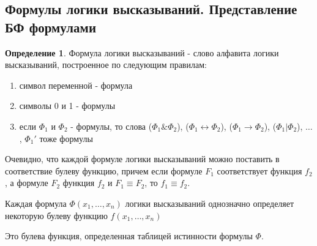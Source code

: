 \documentclass[a4paper]{article}
\theoremstyle{definition}
\newtheorem*{definition}{Определение}
\theoremstyle{remark}
\begin{document}
    \subsection{Формулы логики высказываний. Представление БФ формулами}
    \begin{definition}
        Формула логики высказываний - слово алфавита логики высказываний,
        построенное по следующим правилам:
        \begin{enumerate}
            \item символ переменной - формула
            \item символы 0 и 1 - формулы
            \item если $\Phi_1$ и $\Phi_2$ - формулы, то слова ($\Phi_1 \& \Phi_2$),
            ($\Phi_1 \leftrightarrow \Phi_2$), ($\Phi_1 \rightarrow \Phi_2$), 
            ($\Phi_1 | \Phi_2$), $\dots$ , $\Phi_1 '$ тоже формулы
        \end{enumerate}
    \end{definition}
    Очевидно, что каждой формуле логики высказываний можно поставить в соответствие
    булеву функцию, причем если формуле $F_1$ соответствует функция $f_2$, а 
    формуле $F_2$ функция $f_2$ и $F_1 \equiv F_2$, то $f_1 \equiv f_2$.
    
    Каждая формула $\Phi(x_1, \dots, x_n)$ логики высказываний однозначно
    определяет некоторую булеву функцию $f(x_1, \dots, x_n)$

    Это булева функция, определенная таблицей истинности
    формулы $\Phi$.
\end{document}
